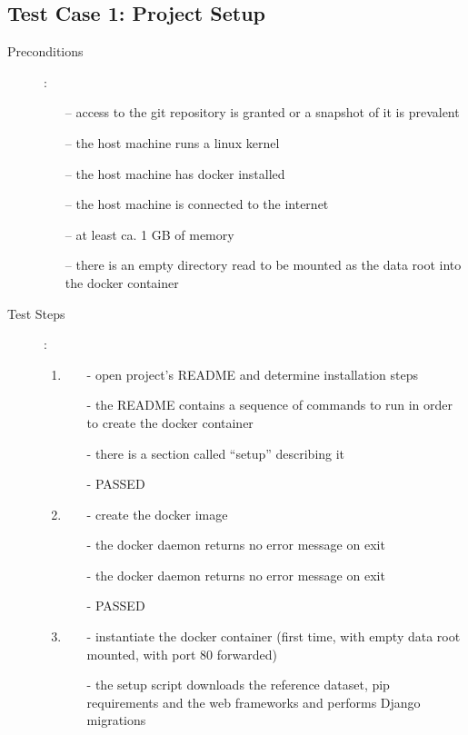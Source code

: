 \subsection{Test Case 1: Project Setup}
\begin{description}
	\item[Preconditions]: 
		\begin{itemize}
			\item [--] access to the git repository is granted or a snapshot of it is prevalent
			\item [--] the host machine runs a linux kernel
			\item [--] the host machine has docker installed
			\item [--] the host machine is connected to the internet
			\item [--] at least ca. 1 GB of memory
			\item [--] there is an empty directory read to be mounted as the data root into the docker container
		\end{itemize}
	\item[Test Steps]: 
	\begin{enumerate}
		\item  
		\begin{itemize}
			\item [-] open project's README and determine installation steps
			\item [-] the README contains a sequence of commands to run in order to create the docker container
			\item [-] there is a section called \enquote{setup} describing it
			\item [-] PASSED
		\end{itemize}
		\item  
		\begin{itemize}
			\item [-] create the docker image
			\item [-] the docker daemon returns no error message on exit
			\item [-] the docker daemon returns no error message on exit
			\item [-] PASSED
		\end{itemize}
		\item  
		\begin{itemize}
			\item [-] instantiate the docker container (first time, with empty data root mounted, with port 80 forwarded)
			\item [-] the setup script downloads the reference dataset, pip requirements and the web frameworks and performs Django migrations

\end{itemize}
\end{enumerate}
\end{description}
